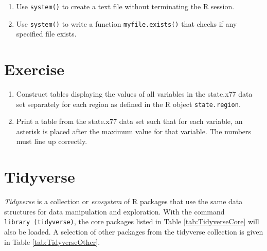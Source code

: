 \documentclass[
]{book}
\providecommand{\tightlist}{%
  \setlength{\itemsep}{0pt}\setlength{\parskip}{0pt}}
\begin{document}
\begin{enumerate}
\def\labelenumi{(\alph{enumi})}
\tightlist
\item
  Use \texttt{system()} to create a text file without terminating the R session.
\item
  Use \texttt{system()} to write a function \texttt{myfile.exists()} that checks if any specified file exists.
\end{enumerate}

\section{Exercise}\label{exercise-13}

\begin{enumerate}
\def\labelenumi{\arabic{enumi}.}
\item
  Construct tables displaying the values of all variables in the state.x77 data set separately for each region as defined in the R object \texttt{state.region}.
\item
  Print a table from the state.x77 data set such that for each variable, an asterisk is placed after the maximum value for that variable. The numbers must line up correctly.
\end{enumerate}

\section{Tidyverse}\label{tidyverse}

\emph{{Tidyverse}} is a collection or \emph{ecosystem} of R packages that use the same data structures for data manipulation and exploration. With the command \texttt{library\ (tidyverse)}, the core packages listed in Table \ref{tab:TidyverseCore} will also be loaded. A selection of other packages from the tidyverse collection is given in Table \ref{tab:TidyverseOther}.
\end{document}
